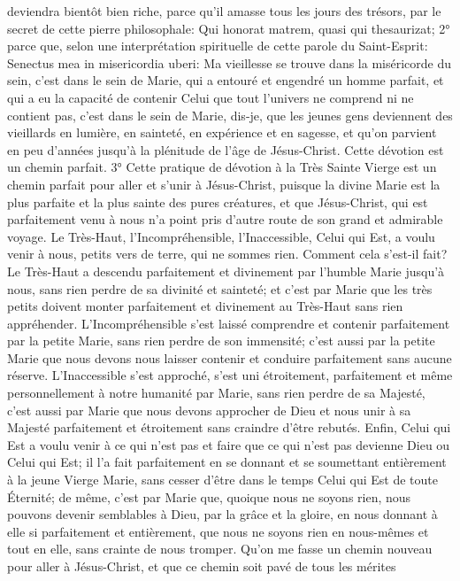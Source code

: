 deviendra bientôt bien riche, parce qu'il amasse tous les jours des trésors, par le secret de cette pierre
philosophale: Qui honorat matrem, quasi qui thesaurizat; 2° parce que, selon une interprétation spirituelle de cette
parole du Saint-Esprit: Senectus mea in misericordia uberi: Ma vieillesse se trouve dans la miséricorde du sein,
c'est dans le sein de Marie, qui a entouré et engendré un homme parfait, et qui a eu la capacité de contenir Celui
que tout l'univers ne comprend ni ne contient pas, c'est dans le sein de Marie, dis-je, que les jeunes gens
deviennent des vieillards en lumière, en sainteté, en expérience et en sagesse, et qu'on parvient en peu d'années
jusqu'à la plénitude de l'âge de Jésus-Christ.
Cette dévotion est un chemin parfait.
 3° Cette pratique de dévotion à la Très Sainte Vierge est un chemin parfait pour aller et s'unir à Jésus-Christ,
puisque la divine Marie est la plus parfaite et la plus sainte des pures créatures, et que Jésus-Christ, qui est
parfaitement venu à nous n'a point pris d'autre route de son grand et admirable voyage. Le Très-Haut,
l'Incompréhensible, l'Inaccessible, Celui qui Est, a voulu venir à nous, petits vers de terre, qui ne sommes rien.
Comment cela s'est-il fait? Le Très-Haut a descendu parfaitement et divinement par l'humble Marie jusqu'à nous,
sans rien perdre de sa divinité et sainteté; et c'est par Marie que les très petits doivent monter parfaitement et
divinement au Très-Haut sans rien appréhender. L'Incompréhensible s'est laissé comprendre et contenir
parfaitement par la petite Marie, sans rien perdre de son immensité; c'est aussi par la petite Marie que nous
devons nous laisser contenir et conduire parfaitement sans aucune réserve.
L'Inaccessible s'est approché, s'est uni étroitement, parfaitement et même personnellement à notre humanité par
Marie, sans rien perdre de sa Majesté, c'est aussi par Marie que nous devons approcher de Dieu et nous unir à sa
Majesté parfaitement et étroitement sans craindre d'être rebutés.
Enfin, Celui qui Est a voulu venir à ce qui n'est pas et faire que ce qui n'est pas devienne Dieu ou Celui qui Est; il
l'a fait parfaitement en se donnant et se soumettant entièrement à la jeune Vierge Marie, sans cesser d'être dans
le temps Celui qui Est de toute Éternité; de même, c'est par Marie que, quoique nous ne soyons rien, nous
pouvons devenir semblables à Dieu, par la grâce et la gloire, en nous donnant à elle si parfaitement et
entièrement, que nous ne soyons rien en nous-mêmes et tout en elle, sans crainte de nous tromper.
 Qu'on me fasse un chemin nouveau pour aller à Jésus-Christ, et que ce chemin soit pavé de tous les mérites
